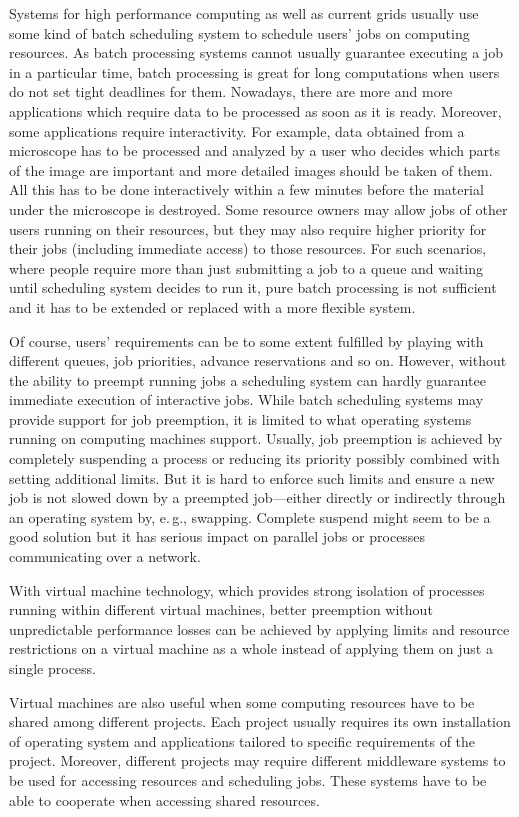 \documentclass{sigplanconf}
\begin{document}
Systems for high performance computing as well as current grids usually use
some kind of batch scheduling system to schedule users' jobs on computing
resources. As batch processing systems cannot usually guarantee executing a
job in a particular time, batch processing is great for long computations when
users do not set tight deadlines for them. Nowadays, there are more and more
applications which require data to be processed as soon as it is ready.
Moreover, some applications require interactivity. For example, data obtained
from a microscope has to be processed and analyzed by a user who decides which
parts of the image are important and more detailed images should be taken of
them. All this has to be done interactively within a few minutes before the
material under the microscope is destroyed. Some resource owners may allow
jobs of other users running on their resources, but they may also require
higher priority for their jobs (including immediate access) to those
resources. For such scenarios, where people require more than just submitting
a job to a queue and waiting until scheduling system decides to run it, pure
batch processing is not sufficient and it has to be extended or replaced with
a more flexible system.

Of course, users' requirements can be to some extent fulfilled by playing with
different queues, job priorities, advance reservations and so on. However,
without the ability to preempt running jobs a scheduling system can hardly
guarantee immediate execution of interactive jobs. While batch scheduling
systems may provide support for job preemption, it is limited to what
operating systems running on computing machines support. Usually, job
preemption is achieved by completely suspending a process or reducing its
priority possibly combined with setting additional limits. But it is hard to
enforce such limits and ensure a new job is not slowed down by a preempted
job---either directly or indirectly through an operating system by, e.\,g.,
swapping. Complete suspend might seem to be a good solution but it has serious
impact on parallel jobs or processes communicating over a network.

With virtual machine technology, which provides strong isolation of processes
running within different virtual machines, better preemption without
unpredictable performance losses can be achieved by applying limits and
resource restrictions on a virtual machine as a whole instead of applying them
on just a single process.

Virtual machines are also useful when some computing resources have to be
shared among different projects. Each project usually requires its own
installation of operating system and applications tailored to specific
requirements of the project. Moreover, different projects may require
different middleware systems to be used for accessing resources and scheduling
jobs. These systems have to be able to cooperate when accessing shared
resources.
\end{document}
